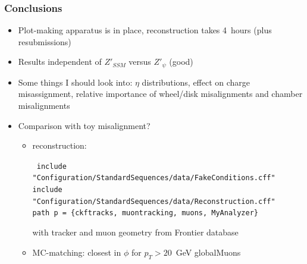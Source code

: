 \documentclass[compress]{beamer}
\begin{document}
\begin{frame}
\frametitle{Conclusions}
\begin{itemize}\setlength{\itemsep}{0.25 cm}
\item Plot-making apparatus is in place, reconstruction takes 4~hours (plus resubmissions)

\item Results independent of $Z'_{SSM}$ versus $Z'_\psi$ (good)

\item Some things I should look into: $\eta$ distributions, effect on
charge misassignment, relative importance of wheel/disk misalignments
and chamber misalignments

\item Comparison with toy misalignment?

\begin{itemize}\setlength{\itemsep}{0.2 cm}
\item reconstruction: 

\vspace{0.2 cm}
\begin{minipage}{0.8\linewidth}
\scriptsize \tt
include "Configuration/StandardSequences/data/FakeConditions.cff" \\
include "Configuration/StandardSequences/data/Reconstruction.cff" \\
\mbox{path p = \{ckftracks, muontracking, muons, MyAnalyzer\}} \\
\end{minipage}

with tracker and muon geometry from Frontier database

\vspace{0.1 cm}
\item MC-matching: closest in $\phi$ for $p_T > 20$~GeV globalMuons
\end{itemize}
\end{itemize}
\label{numpages}
\end{frame}
\end{document}
